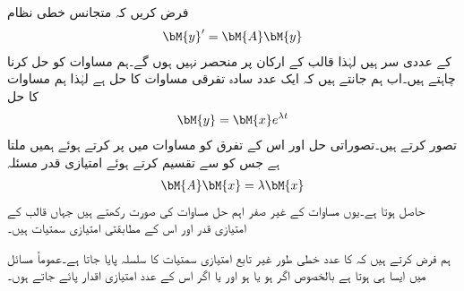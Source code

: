 فرض کریں کہ متجانس خطی نظام
\begin{align}\label{مساوات_نظام_مستقل_عددی_سر_نظام_الف}
\bM{y}'=\bM{A}\bM{y}
\end{align}
کے عددی سر  ہیں لہٰذا  قالب  کے ارکان  پر منحصر نہیں ہوں گے۔ہم مساوات  کو حل کرنا چاہتے ہیں۔اب ہم جانتے ہیں کہ ایک عدد سادہ تفرقی مساوات  کا حل  ہے لہٰذا ہم مساوات  کا حل 
\begin{align}\label{مساوات_نظام_مستقل_عددی_سر_نظام_ب}
\bM{y}=\bM{x}e^{\lambda t}
\end{align}
تصور کرتے ہیں۔تصوراتی حل اور اس کے تفرق  کو مساوات  میں پر کرتے ہوئے  ہمیں  ملتا ہے جس کو  سے تقسیم کرتے ہوئے امتیازی قدر مسئلہ
\begin{align}\label{مساوات_نظام_مستقل_عددی_سر_نظام_پ}
\bM{A}\bM{x}=\lambda \bM{x}
\end{align}
حاصل ہوتا ہے۔یوں مساوات  کے غیر صفر اہم حل مساوات  کی صورت رکھتے ہیں جہاں  قالب  کے امتیازی قدر اور  اس کے مطابقتی امتیازی سمتیات ہیں۔

ہم فرض کرتے ہیں کہ  کا  عدد خطی طور غیر تابع امتیازی سمتیات کا سلسلہ پایا جاتا ہے۔عموماً مسائل میں ایسا ہی ہوتا ہے  بالخصوص اگر   ہو  یا   ہو اور یا اگر اس کے  عدد  امتیازی اقدار پائے جاتے ہوں۔

